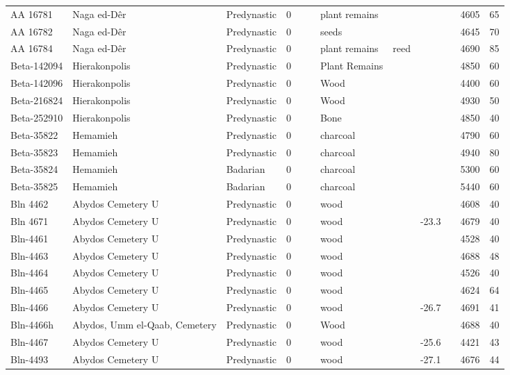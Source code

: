 \documentclass[a4paper,8pt]{article}
\begin{document}
\begin{landscape}
\begin{center}
\begin{longtable}{|l|>{\raggedright}p{20ex}|l|r|l|>{\raggedright}p{25ex}|l|l|r|l|r|r|}
AA 16781 & Naga ed-Dêr & Predynastic & 0 &  &  & plant remains &  &   &  & 4605 & 65\\
AA 16782 & Naga ed-Dêr & Predynastic & 0 &  &  & seeds &  &   &  & 4645 & 70\\
AA 16784 & Naga ed-Dêr & Predynastic & 0 &  &  & plant remains & reed &   &  & 4690 & 85\\
Beta-142094 & Hierakonpolis & Predynastic & 0 &  &  & Plant Remains &  &   &  & 4850 & 60\\
Beta-142096 & Hierakonpolis & Predynastic & 0 &  &  & Wood &  &   &  & 4400 & 60\\
Beta-216824 & Hierakonpolis & Predynastic & 0 &  &  & Wood &  &   &  & 4930 & 50\\
Beta-252910 & Hierakonpolis & Predynastic & 0 &  &  & Bone &  &   &  & 4850 & 40\\
Beta-35822 & Hemamieh & Predynastic & 0 &  &  & charcoal &  &   &  & 4790 & 60\\
Beta-35823 & Hemamieh & Predynastic & 0 &  &  & charcoal &  &   &  & 4940 & 80\\
Beta-35824 & Hemamieh & Badarian & 0 &  &  & charcoal &  &   &  & 5300 & 60\\
Beta-35825 & Hemamieh & Badarian & 0 &  &  & charcoal &  &   &  & 5440 & 60\\
Bln 4462 & Abydos Cemetery U & Predynastic & 0 &  &  & wood &  &   &  & 4608 & 40\\
Bln 4671 & Abydos Cemetery U & Predynastic & 0 &  &  & wood &  & -23.3 &  & 4679 & 40\\
Bln-4461 & Abydos Cemetery U & Predynastic & 0 &  &  & wood &  &   &  & 4528 & 40\\
Bln-4463 & Abydos Cemetery U & Predynastic & 0 &  &  & wood &  &   &  & 4688 & 48\\
Bln-4464 & Abydos Cemetery U & Predynastic & 0 &  &  & wood &  &   &  & 4526 & 40\\
Bln-4465 & Abydos Cemetery U & Predynastic & 0 &  &  & wood &  &   &  & 4624 & 64\\
Bln-4466 & Abydos Cemetery U & Predynastic & 0 &  &  & wood &  & -26.7 &  & 4691 & 41\\
Bln-4466h & Abydos, Umm el-Qaab, Cemetery  & Predynastic & 0 &  &  & Wood &  &   &  & 4688 & 40\\
Bln-4467 & Abydos Cemetery U & Predynastic & 0 &  &  & wood &  & -25.6 &  & 4421 & 43\\
Bln-4493 & Abydos Cemetery U & Predynastic & 0 &  &  & wood &  & -27.1 &  & 4676 & 44\\

\end{longtable}
\end{center}
\end{landscape}
\end{document}
